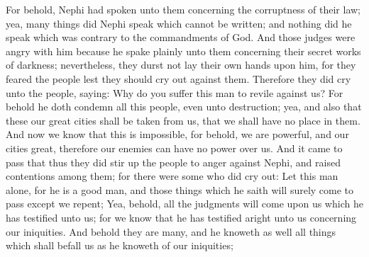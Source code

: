For behold, Nephi had spoken unto them concerning the corruptness of their law; yea, many things did Nephi speak which cannot be written; and nothing did he speak which was contrary to the commandments of God.
\bverse \iffalse And those judges were angry with him because he spake plainly unto them concerning their secret works of darkness; nevertheless, they durst not lay their own hands upon him, for they feared the people lest they should cry out against them. \fi
And those judges were angry with him because he spake plainly unto them concerning their secret works of darkness; nevertheless, they durst not lay their own hands upon him, for they feared the people lest they should cry out against them.
\bverse \iffalse Therefore they did cry unto the people, saying: Why do you suffer this man to revile against us? For behold he doth condemn all this people, even unto destruction; yea, and also that these our great cities shall be taken from us, that we shall have no place in them. \fi
Therefore they did cry unto the people, saying: Why do you suffer this man to revile against us? For behold he doth condemn all this people, even unto destruction; yea, and also that these our great cities shall be taken from us, that we shall have no place in them.
\bverse \iffalse And now we know that this is impossible, for behold, we are powerful, and our cities great, therefore our enemies can have no power over us. \fi
And now we know that this is impossible, for behold, we are powerful, and our cities great, therefore our enemies can have no power over us.
\bverse \iffalse And it came to pass that thus they did stir up the people to anger against Nephi, and raised contentions among them; for there were some who did cry out: Let this man alone, for he is a good man, and those things which he saith will surely come to pass except we repent; \fi
And it came to pass that thus they did stir up the people to anger against Nephi, and raised contentions among them; for there were some who did cry out: Let this man alone, for he is a good man, and those things which he saith will surely come to pass except we repent;
\bverse \iffalse Yea, behold, all the judgments will come upon us which he has testified unto us; for we know that he has testified aright unto us concerning our iniquities. And behold they are many, and he knoweth as well all things which shall befall us as he knoweth of our iniquities; \fi
Yea, behold, all the judgments will come upon us which he has testified unto us; for we know that he has testified aright unto us concerning our iniquities. And behold they are many, and he knoweth as well all things which shall befall us as he knoweth of our iniquities;
